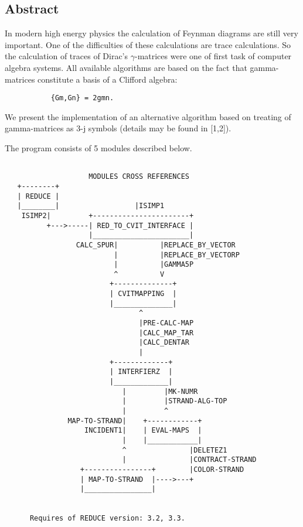 
\subsection*{Abstract}

In modern high energy physics the calculation of Feynman diagrams are
still very important. One of the difficulties of these calculations
are trace calculations. So the calculation of traces of Dirac's
$\gamma$-matrices were one of first task of computer algebra systems.
All available algorithms are based on the fact that gamma-matrices
constitute a basis of a Clifford algebra:
\begin{verbatim}
           {Gm,Gn} = 2gmn.
\end{verbatim}

We present the implementation of an alternative algorithm based on
treating of gamma-matrices as 3-j symbols (details may be found in
[1,2]).

The program consists of 5 modules described below.

\newpage
\begin{verbatim}

                    MODULES CROSS REFERENCES
   +--------+
   | REDUCE |
   |________|                  |ISIMP1
    ISIMP2|         +-----------------------+
          +--->-----| RED_TO_CVIT_INTERFACE |
                    |_______________________|
                 CALC_SPUR|          |REPLACE_BY_VECTOR
                          |          |REPLACE_BY_VECTORP
                          |          |GAMMA5P
                          ^          V
                         +--------------+
                         | CVITMAPPING  |
                         |______________|
                                ^
                                |PRE-CALC-MAP
                                |CALC_MAP_TAR
                                |CALC_DENTAR
                                |
                         +-------------+
                         | INTERFIERZ  |
                         |_____________|
                            |         |MK-NUMR
                            |         |STRAND-ALG-TOP
                            |         ^
               MAP-TO-STRAND|    +------------+
                   INCIDENT1|    | EVAL-MAPS  |
                            |    |____________|
                            ^               |DELETEZ1
                            |               |CONTRACT-STRAND
                  +----------------+        |COLOR-STRAND
                  | MAP-TO-STRAND  |---->---+
                  |________________|


      Requires of REDUCE version: 3.2, 3.3.
\end{verbatim}


